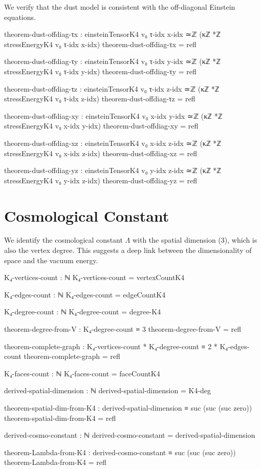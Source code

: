 \documentclass[11pt,a4paper]{book}
\begin{document}
We verify that the dust model is consistent with the off-diagonal Einstein equations.

\begin{code}
theorem-dust-offdiag-τx : einsteinTensorK4 v₀ τ-idx x-idx ≃ℤ (κℤ *ℤ stressEnergyK4 v₀ τ-idx x-idx)
theorem-dust-offdiag-τx = refl

theorem-dust-offdiag-τy : einsteinTensorK4 v₀ τ-idx y-idx ≃ℤ (κℤ *ℤ stressEnergyK4 v₀ τ-idx y-idx)
theorem-dust-offdiag-τy = refl

theorem-dust-offdiag-τz : einsteinTensorK4 v₀ τ-idx z-idx ≃ℤ (κℤ *ℤ stressEnergyK4 v₀ τ-idx z-idx)
theorem-dust-offdiag-τz = refl

theorem-dust-offdiag-xy : einsteinTensorK4 v₀ x-idx y-idx ≃ℤ (κℤ *ℤ stressEnergyK4 v₀ x-idx y-idx)
theorem-dust-offdiag-xy = refl

theorem-dust-offdiag-xz : einsteinTensorK4 v₀ x-idx z-idx ≃ℤ (κℤ *ℤ stressEnergyK4 v₀ x-idx z-idx)
theorem-dust-offdiag-xz = refl

theorem-dust-offdiag-yz : einsteinTensorK4 v₀ y-idx z-idx ≃ℤ (κℤ *ℤ stressEnergyK4 v₀ y-idx z-idx)
theorem-dust-offdiag-yz = refl
\end{code}

\section{Cosmological Constant}

We identify the cosmological constant $\Lambda$ with the spatial dimension (3), which is also the vertex degree. This suggests a deep link between the dimensionality of space and the vacuum energy.

\begin{code}
K₄-vertices-count : ℕ
K₄-vertices-count = vertexCountK4

K₄-edges-count : ℕ
K₄-edges-count = edgeCountK4

K₄-degree-count : ℕ
K₄-degree-count = degree-K4

theorem-degree-from-V : K₄-degree-count ≡ 3
theorem-degree-from-V = refl

theorem-complete-graph : K₄-vertices-count * K₄-degree-count ≡ 2 * K₄-edges-count
theorem-complete-graph = refl

K₄-faces-count : ℕ
K₄-faces-count = faceCountK4

derived-spatial-dimension : ℕ
derived-spatial-dimension = K4-deg

theorem-spatial-dim-from-K4 : derived-spatial-dimension ≡ suc (suc (suc zero))
theorem-spatial-dim-from-K4 = refl

derived-cosmo-constant : ℕ
derived-cosmo-constant = derived-spatial-dimension

theorem-Lambda-from-K4 : derived-cosmo-constant ≡ suc (suc (suc zero))
theorem-Lambda-from-K4 = refl
\end{code}
\end{document}
